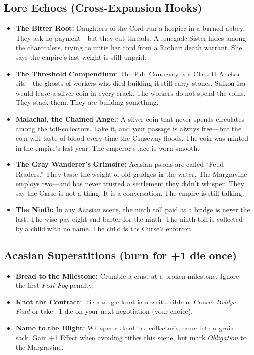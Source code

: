 \subsection*{Lore Echoes (Cross-Expansion Hooks)}
\begin{itemize}
  \item \textbf{The Bitter Root:} Daughters of the Cord run a hospice in a burned abbey. They ask no payment---but they cut threads. A renegade Sister hides among the charcoalers, trying to untie her cord from a Rothari death warrant. She says the empire's last weight is still unpaid.
  \item \textbf{The Threshold Compendium:} The Pale Causeway is a Class II Anchor site---the ghosts of workers who died building it still carry stones. Saikou Ira would leave a silver coin in every crack. The workers do not spend the coins. They stack them. They are building something.
  \item \textbf{Malachai, the Chained Angel:} A silver coin that never spends circulates among the toll-collectors. Take it, and your passage is always free---but the coin will taste of blood every time the Causeway floods. The coin was minted in the empire's last year. The emperor's face is worn smooth.
  \item \textbf{The Gray Wanderer's Grimoire:} Acasian psions are called ``Feud-Readers.'' They taste the weight of old grudges in the water. The Margravine employs two---and has never trusted a settlement they didn't whisper. They say the Curse is not a thing. It is a conversation. The empire is still talking.
  \item \textbf{The Ninth:} In any Acasian scene, the ninth toll paid at a bridge is never the last. The wise pay eight and barter for the ninth. The ninth toll is collected by a child with no name. The child is the Curse's enforcer.
\end{itemize}

\subsection*{Acasian Superstitions (burn for +1 die once)}
\begin{itemize}
  \item \textbf{Bread to the Milestone:} Crumble a crust at a broken milestone. Ignore the first \emph{Peat-Fog} penalty.
  \item \textbf{Knot the Contract:} Tie a single knot in a writ's ribbon. Cancel \emph{Bridge Feud} or take --1 die on your next negotiation (your choice).
  \item \textbf{Name to the Blight:} Whisper a dead tax collector's name into a grain sack. Gain +1 Effect when avoiding tithes this scene, but mark \emph{Obligation} to the Margravine.
\end{itemize}

